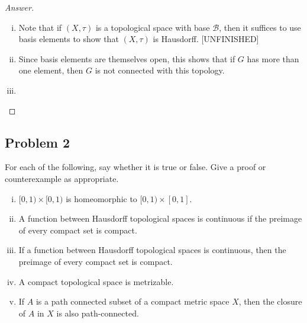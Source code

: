\documentclass[12pt]{article}
\newcommand{\ita}[1]{\textit{#1}}
\theoremstyle{definition}
\begin{document}
\begin{proof}[Answer]
\begin{enumerate}[(i)]
        Note that this makes $\varphi$ a homeomorphism from $G$ to itself. However, $\varphi$ is an \ita{isomorphism} if and only if $G$ is abelian.
        \item Note that if $(X,\tau)$ is a topological space with base $\mathcal{B}$, then it suffices to use basis elements to show that $(X,\tau)$ is Hausdorff. [UNFINISHED]
        \item Since basis elements are themselves open, this shows that if $G$ has more than one element, then $G$ is not connected with this topology. 
        \item 
    \end{enumerate}
\end{proof}
\subsection{Problem 2 \texorpdfstring{\cite{Leon,proper}}{}}
For each of the following, say whether it is true or false. Give a proof or counterexample as appropriate.
\begin{enumerate}[(i)]
    \item $[0,1) \times [0,1)$ is homeomorphic to $[0,1) \times [0,1]$.
    \item A function between Hausdorff topological spaces is continuous if the preimage of every compact set is compact.
    \item If a function between Hausdorff topological spaces is continuous, then the preimage of every compact set is compact.
    \item A compact topological space is metrizable.
    \item If $A$ is a path connected subset of a compact metric space $X$, then the closure of $A$ in $X$ is also path-connected.
\end{enumerate}
\end{document}
